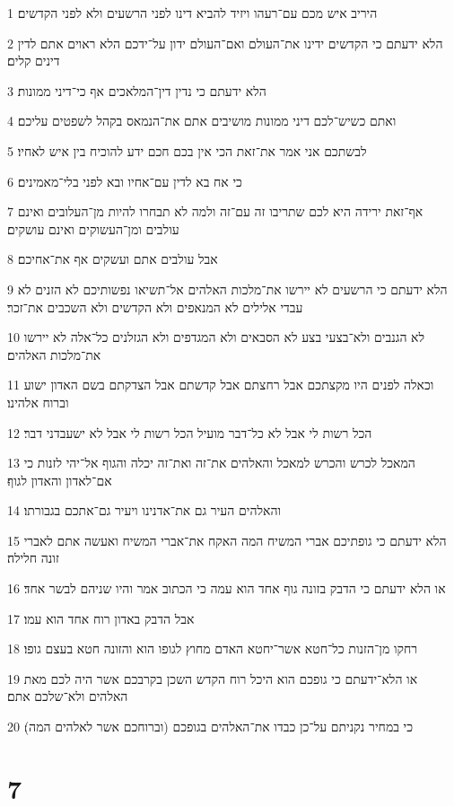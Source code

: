 \par 1 היריב איש מכם עם־רעהו ויזיד להביא דינו לפני הרשעים ולא לפני הקדשים׃
\par 2 הלא ידעתם כי הקדשים ידינו את־העולם ואם־העולם ידון על־ידכם הלא ראוים אתם לדין דינים קלים׃
\par 3 הלא ידעתם כי נדין דין־המלאכים אף כי־דיני ממונות׃
\par 4 ואתם כשיש־לכם דיני ממונות מושיבים אתם את־הנמאס בקהל לשפטים עליכם׃
\par 5 לבשתכם אני אמר את־זאת הכי אין בכם חכם ידע להוכיח בין איש לאחיו׃
\par 6 כי אח בא לדין עם־אחיו ובא לפני בלי־מאמינים׃
\par 7 אף־זאת ירידה היא לכם שתריבו זה עם־זה ולמה לא תבחרו להיות מן־העלובים ואינם עולבים ומן־העשוקים ואינם עושקים׃
\par 8 אבל עולבים אתם ועשקים אף את־אחיכם׃
\par 9 הלא ידעתם כי הרשעים לא יירשו את־מלכות האלהים אל־תשיאו נפשותיכם לא הזנים לא עבדי אלילים לא המנאפים ולא הקדשים ולא השכבים את־זכר׃
\par 10 לא הגנבים ולא־בצעי בצע לא הסבאים ולא המגדפים ולא הגזלנים כל־אלה לא יירשו את־מלכות האלהים׃
\par 11 וכאלה לפנים היו מקצתכם אבל רחצתם אבל קדשתם אבל הצדקתם בשם האדון ישוע וברוח אלהינו׃
\par 12 הכל רשות לי אבל לא כל־דבר מועיל הכל רשות לי אבל לא ישעבדני דבר׃
\par 13 המאכל לכרש והכרש למאכל והאלהים את־זה ואת־זה יכלה והגוף אל־יהי לזנות כי אם־לאדון והאדון לגוף׃
\par 14 והאלהים העיר גם את־אדנינו ויעיר גם־אתכם בגבורתו׃
\par 15 הלא ידעתם כי גופתיכם אברי המשיח המה האקח את־אברי המשיח ואעשה אתם לאברי זונה חלילה׃
\par 16 או הלא ידעתם כי הדבק בזונה גוף אחד הוא עמה כי הכתוב אמר והיו שניהם לבשר אחד׃
\par 17 אבל הדבק באדון רוח אחד הוא עמו׃
\par 18 רחקו מן־הזנות כל־חטא אשר־יחטא האדם מחוץ לגופו הוא והזונה חטא בעצם גופו׃
\par 19 או הלא־ידעתם כי גופכם הוא היכל רוח הקדש השכן בקרבכם אשר היה לכם מאת האלהים ולא־שלכם אתם׃
\par 20 כי במחיר נקניתם על־כן כבדו את־האלהים בגופכם (וברוחכם אשר לאלהים המה)׃

\chapter{7}

